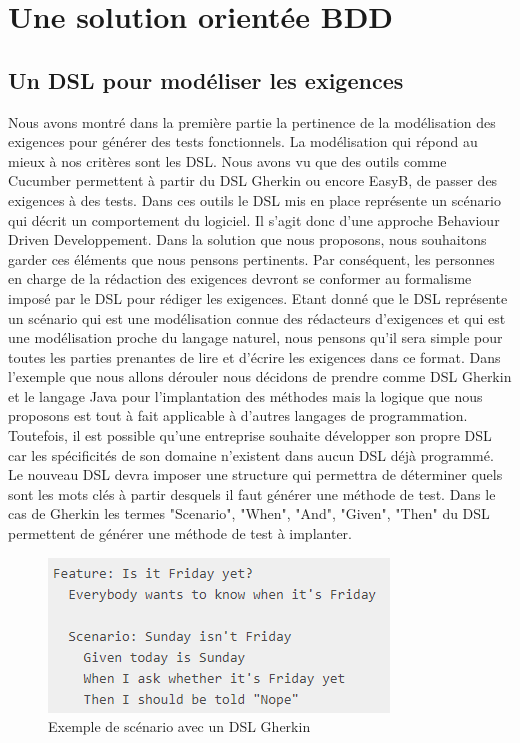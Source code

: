 \chapter{Une solution orientée BDD}
\label{chap:secondchapitre}

\section{Un DSL pour modéliser les exigences}

Nous avons montré dans la première partie la pertinence de la modélisation des exigences pour générer des tests fonctionnels. La modélisation qui répond au mieux à nos critères sont les DSL.  Nous avons vu que des outils comme Cucumber permettent à partir du DSL Gherkin ou encore EasyB, de passer des exigences à des tests.  Dans ces outils le DSL mis en place représente un scénario qui décrit un comportement du logiciel. Il s’agit donc d’une approche Behaviour Driven Developpement. Dans la solution que nous proposons, nous souhaitons garder ces éléments que nous pensons pertinents. Par conséquent, les personnes en charge de la rédaction des exigences devront se conformer au formalisme imposé par le DSL pour rédiger les exigences. Etant donné que le DSL représente un scénario qui est une modélisation connue des rédacteurs d'exigences et qui est une modélisation proche du langage naturel, nous pensons qu'il sera simple pour toutes les parties prenantes de lire et d'écrire les exigences dans ce format. 
Dans l'exemple que nous allons dérouler nous décidons de prendre comme DSL Gherkin et le langage Java pour l'implantation des méthodes mais la logique que nous proposons est tout à fait applicable à d'autres langages de programmation. Toutefois, il est possible qu'une entreprise souhaite développer son propre DSL car les spécificités de son domaine n'existent dans aucun DSL déjà programmé. Le nouveau DSL  devra imposer une structure qui permettra de déterminer quels sont les mots clés à partir desquels il faut générer une méthode de test. Dans le cas de Gherkin les termes "Scenario", "When", "And", "Given", "Then" du DSL permettent de générer une méthode de test à implanter. 

            \begin{figure}[H]
                \centering
                \includegraphics[width=\textwidth]{images/dsldsl.PNG}
                \caption{Exemple de scénario avec un DSL Gherkin}
            \end{figure}

